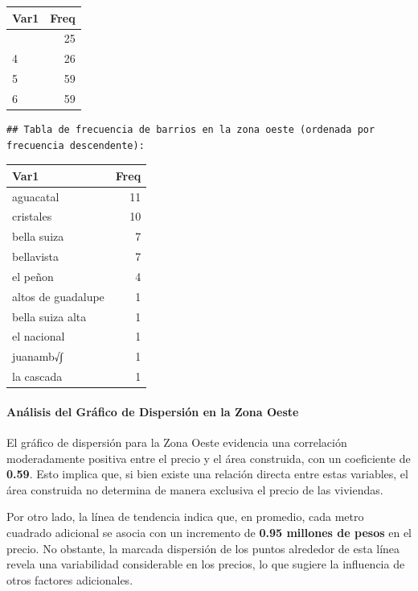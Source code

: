 \documentclass[
]{article}
\begin{document}
\begin{longtable}[]{@{}lr@{}}
\toprule\noalign{}
Var1 & Freq \\
\midrule\noalign{}
\endhead
\bottomrule\noalign{}
\endlastfoot
3 & 25 \\
4 & 26 \\
5 & 59 \\
6 & 59 \\
\end{longtable}

\begin{verbatim}
## Tabla de frecuencia de barrios en la zona oeste (ordenada por frecuencia descendente):
\end{verbatim}

\begin{longtable}[]{@{}lr@{}}
\toprule\noalign{}
Var1 & Freq \\
\midrule\noalign{}
\endhead
\bottomrule\noalign{}
\endlastfoot
aguacatal & 11 \\
cristales & 10 \\
bella suiza & 7 \\
bellavista & 7 \\
el peñon & 4 \\
altos de guadalupe & 1 \\
bella suiza alta & 1 \\
el nacional & 1 \\
juanamb√∫ & 1 \\
la cascada & 1 \\
\end{longtable}

\paragraph{\texorpdfstring{\textbf{Análisis del Gráfico de Dispersión en
la Zona
Oeste}}{Análisis del Gráfico de Dispersión en la Zona Oeste}}\label{anuxe1lisis-del-gruxe1fico-de-dispersiuxf3n-en-la-zona-oeste}

El gráfico de dispersión para la Zona Oeste evidencia una correlación
moderadamente positiva entre el precio y el área construida, con un
coeficiente de \textbf{0.59}. Esto implica que, si bien existe una
relación directa entre estas variables, el área construida no determina
de manera exclusiva el precio de las viviendas.

Por otro lado, la línea de tendencia indica que, en promedio, cada metro
cuadrado adicional se asocia con un incremento de \textbf{0.95 millones
de pesos} en el precio. No obstante, la marcada dispersión de los puntos
alrededor de esta línea revela una variabilidad considerable en los
precios, lo que sugiere la influencia de otros factores adicionales.
\end{document}

